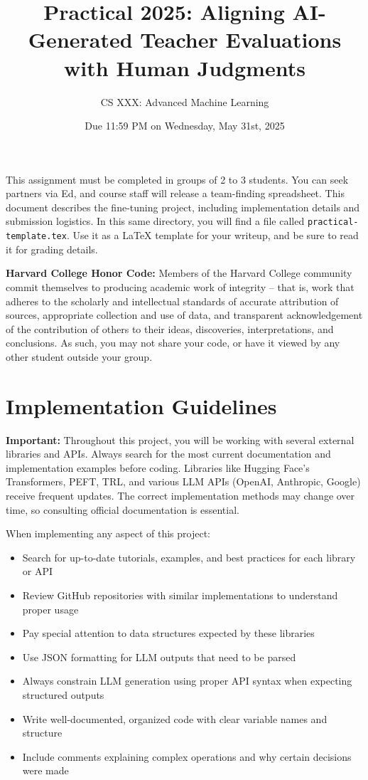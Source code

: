 \documentclass[11pt]{article}
\title{Practical 2025: Aligning AI-Generated Teacher Evaluations with Human Judgments}
\author{CS XXX: Advanced Machine Learning}
\date{Due 11:59 PM on Wednesday, May 31st, 2025}
\begin{document}
\maketitle

This assignment must be completed in groups of 2 to 3 students. You can seek partners via Ed, and course staff will release a team-finding spreadsheet. This document describes the fine-tuning project, including implementation details and submission logistics. In this same directory, you will find a file called \texttt{practical-template.tex}. Use it as a \LaTeX{} template for your writeup, and be sure to read it for grading details.

\textbf{Harvard College Honor Code:} Members of the Harvard College community commit themselves to producing academic work of integrity – that is, work that adheres to the scholarly and intellectual standards of accurate attribution of sources, appropriate collection and use of data, and transparent acknowledgement of the contribution of others to their ideas, discoveries, interpretations, and conclusions. As such, you may not share your code, or have it viewed by any other student outside your group.

\section{Implementation Guidelines}

\textbf{Important:} Throughout this project, you will be working with several external libraries and APIs. Always search for the most current documentation and implementation examples before coding. Libraries like Hugging Face's Transformers, PEFT, TRL, and various LLM APIs (OpenAI, Anthropic, Google) receive frequent updates. The correct implementation methods may change over time, so consulting official documentation is essential.

When implementing any aspect of this project:
\begin{itemize}
    \item Search for up-to-date tutorials, examples, and best practices for each library or API
    \item Review GitHub repositories with similar implementations to understand proper usage
    \item Pay special attention to data structures expected by these libraries
    \item Use JSON formatting for LLM outputs that need to be parsed
    \item Always constrain LLM generation using proper API syntax when expecting structured outputs
    \item Write well-documented, organized code with clear variable names and structure
    \item Include comments explaining complex operations and why certain decisions were made
\end{itemize}
\end{document}
